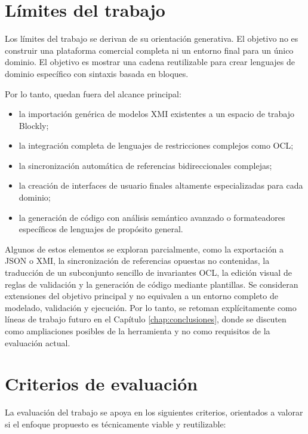 \section{Límites del trabajo}
\label{sec:limites}

Los límites del trabajo se derivan de su orientación generativa. El objetivo no
es construir una plataforma comercial completa ni un entorno final para un único
dominio. El objetivo es mostrar una cadena reutilizable para crear lenguajes de
dominio específico con sintaxis basada en bloques.

Por lo tanto, quedan fuera del alcance principal:

\begin{itemize}
  \item la importación genérica de modelos XMI existentes a un espacio de trabajo
  Blockly;
  \item la integración completa de lenguajes de restricciones complejos como OCL;
  \item la sincronización automática de referencias bidireccionales complejas;
  \item la creación de interfaces de usuario finales altamente especializadas
  para cada dominio;
  \item la generación de código con análisis semántico avanzado o formateadores
  específicos de lenguajes de propósito general.
\end{itemize}

Algunos de estos elementos se exploran parcialmente, como la exportación a JSON
o XMI, la sincronización de referencias opuestas no contenidas, la traducción de
un subconjunto sencillo de invariantes OCL, la edición visual de reglas de
validación y la generación de código mediante plantillas. Se consideran
extensiones del objetivo principal y no equivalen a un entorno completo de
modelado, validación y ejecución.
Por lo tanto, se retoman explícitamente como líneas de trabajo futuro en el
Capítulo \ref{chap:conclusiones}, donde se discuten como ampliaciones posibles
de la herramienta y no como requisitos de la evaluación actual.

\section{Criterios de evaluación}
\label{sec:criterios-evaluacion}

La evaluación del trabajo se apoya en los siguientes criterios, orientados a
valorar si el enfoque propuesto es técnicamente viable y reutilizable:

